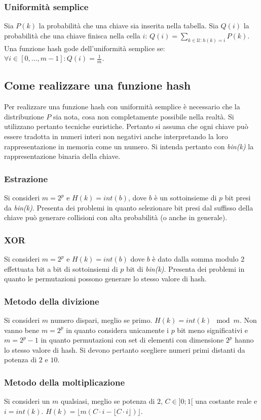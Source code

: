 \subsubsection{Uniformit\`a semplice}
Sia $P(k)$ la probabilit\`a che una chiave sia inserita nella tabella. Sia $Q(i)$ la probabilit\`a che una chiave finisca nella cella $i$: $Q(i)=
\sum\limits_{k\in\mathcal{U}:h(k)=i}P(k)$. Una funzione hash gode dell'uniformit\`a semplice se: $\forall i\in [0,\dots, m-1]: Q(i)=\frac{1}{m}$.
\subsection{Come realizzare una funzione hash}
Per realizzare una funzione hash con uniformit\`a semplice \`e necessario che la distribuzione $P$ sia nota, cosa non completamente possibile nella 
realt\`a. Si utilizzano pertanto tecniche euristiche. Pertanto si assuma che ogni chiave pu\`o essere tradotta in numeri interi non negativi anche 
interpretando la loro rappresentazione in memoria come un numero. Si intenda pertanto con \emph{bin(k)} la rappresentazione binaria della chiave.
\subsubsection{Estrazione}
Si consideri $m=2^p$ e $H(k)=int(b)$, dove $b$ \`e un sottoinsieme di $p$ bit presi da \emph{bin(k)}. Presenta dei problemi in quanto selezionare bit presi
dal suffisso della chiave pu\`o generare collisioni con alta probabilit\`a (o anche in generale).
\subsubsection{XOR}
Si consideri $m=2^p$ e $H(k)=int(b)$ dove $b$ \`e dato dalla somma modulo 2 effettuata bit a bit di sottoinsiemi di $p$ bit di \emph{bin(k)}. Presenta dei 
problemi in quanto le permutazioni possono generare lo stesso valore di hash.
\subsubsection{Metodo della divizione}
Si consideri $m$ numero dispari, meglio se primo. $H(k)=int(k)\mod m$. Non vanno bene $m=2^p$ in quanto considera unicamente i $p$ bit meno significativi
e $m= 2^p-1$ in quanto permutazioni con set di elementi con dimensione $2^p$ hanno lo stesso valore di hash. Si devono pertanto scegliere numeri primi 
distanti da potenza di $2$ e $10$. 
\subsubsection{Metodo della moltiplicazione}
Si consideri un $m$ qualsiasi, meglio se potenza di $2$, $C\in]0;1[$ una costante reale e $i=int(k)$. $H(k)=\lfloor m(C\cdot i-\lfloor C\cdot i\rfloor)
\rfloor$.
